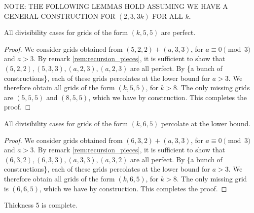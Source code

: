 NOTE: THE FOLLOWING LEMMAS HOLD ASSUMING WE HAVE A GENERAL CONSTRUCTION FOR $(2,3,3k)$ FOR ALL $k$.
\begin{lem}
\label{lem:width_5}
All divisibility cases for grids of the form $(k,5,5)$ are perfect.
\end{lem}

\begin{proof}
We consider grids obtained from $(5,2,2) + (a,3,3)$, for $a \equiv 0 \pmod 3$ and $a >3$. By remark \ref{rem:recursion_pieces}, it is sufficient to show that $(5,2,2), (5,3,3), (a,2,3), (a,2,3)$ are all perfect. By \{a bunch of constructions\}, each of these grids percolates at the lower bound for $a>3$. We therefore obtain all grids of the form $(k,5,5)$, for $k>8$. The only missing grids are $(5,5,5)$ and $(8,5,5)$, which we have by construction. This completes the proof. 
\end{proof}

\begin{lem}
\label{lem:width_6}
All divisibility cases for grids of the form $(k,6,5)$ percolate at the lower bound.
\end{lem}

\begin{proof}
We consider grids obtained from $(6,3,2) + (a,3,3)$, for $a \equiv 0 \pmod 3$ and $a >3$. By remark \ref{rem:recursion_pieces}, it is sufficient to show that $(6,3,2), (6,3,3), (a,3,3), (a,3,2)$ are all perfect. By \{a bunch of constructions\}, each of these grids percolates at the lower bound for $a>3$. We therefore obtain all grids of the form $(k,6,5)$, for $k>8$. The only missing grid is $(6,6,5)$, which we have by construction. This completes the proof. 
\end{proof}

\begin{lem}
Thickness 5 is complete.
\end{lem}

